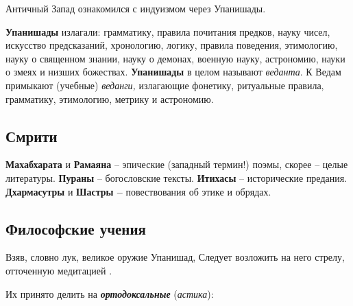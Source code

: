 Античный Запад ознакомился с индуизмом через Упанишады.

\textbf{Упанишады} излагали: грамматику, правила почитания предков, науку чисел, искусство предсказаний, хронологию,
логику, правила поведения, этимологию, науку о священном знании, науку о демонах, военную науку, астрономию, науки о
змеях и низших божествах. \textbf{Упанишады} в целом называют \textit{веданта}. К Ведам примыкают (учебные)
\textit{веданги, }излагающие фонетику,\textit{ }ритуальные правила, грамматику, этимологию, метрику и астрономию.

\subsection[Смрити]{Смрити}
\textbf{Махабхарата} и \textbf{Рамаяна} – эпические (западный термин!) поэмы, скорее – целые литературы. \textbf{Пураны}
– богословские тексты. \textbf{Итихасы} – исторические предания. \textbf{Дхармасутры} и \textbf{Шастры – }повествования
об этике и обрядах.

\subsection{Философские учения }
\begin{flushright}
    
\textquotedbl Взяв, словно лук, великое оружие Упанишад,\newline
Следует возложить на него стрелу, отточенную медитацией \textquotedbl.
\end{flushright}

Их принято делить на \textbf{\textit{ортодоксальные}} (\textit{астика}):

